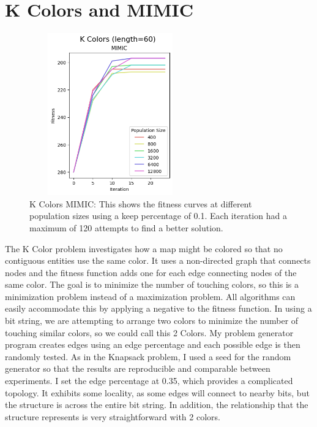 \documentclass[letterpaper]{article} %
\begin{document}
\section{K Colors and MIMIC}

\begin{figure}[!htb]
\centering
\includegraphics[width=2.75in, height=2.75in]{figures/K_Colors_length=60_MIMIC_l_60_ma_120_p_400__800__1600__3200__6400__12800_k_0.1_.png}
\caption{K Colors MIMIC: This shows the fitness curves at different population sizes using a keep percentage of 0.1. Each iteration had a maximum of 120 attempts to find a better solution. }
\label{fig:kcolor_mimic}
\end{figure}


The K Color problem investigates how a map might be colored so that no contiguous entities use the same color.  It uses a non-directed graph that connects nodes and the fitness function adds one for each edge connecting nodes of the same color.  The goal is to minimize the number of touching colors, so this is a minimization problem instead of a maximization problem.  All algorithms can easily accommodate this by applying a negative to the fitness function.   In using a bit string, we are attempting to arrange two colors to minimize the number of touching similar colors, so we could call this 2 Colors.  My problem generator program creates edges using an edge percentage and each possible edge is then randomly tested.  As in the Knapsack problem, I used a seed for the random generator so that the results are reproducible and comparable between experiments.  I set the edge percentage at 0.35, which provides a complicated topology.  It exhibits some locality, as some edges will connect to nearby bits, but the structure is across the entire bit string.  In addition, the relationship that the structure represents is very straightforward with 2 colors. 
\end{document}
